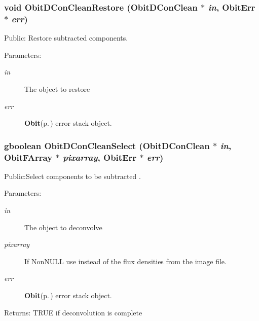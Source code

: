 \subsubsection{\setlength{\rightskip}{0pt plus 5cm}void Obit\-DCon\-Clean\-Restore ({\bf Obit\-DCon\-Clean} $\ast$ {\em in}, {\bf Obit\-Err} $\ast$ {\em err})}\label{ObitDConClean_8h_a25}


Public: Restore subtracted components. 

\begin{Desc}
\item[Parameters:]
\begin{description}
\item[{\em in}]The object to restore \item[{\em err}]{\bf Obit}{\rm (p.\,\pageref{structObit})} error stack object. \end{description}
\end{Desc}
\subsubsection{\setlength{\rightskip}{0pt plus 5cm}gboolean Obit\-DCon\-Clean\-Select ({\bf Obit\-DCon\-Clean} $\ast$ {\em in}, {\bf Obit\-FArray} $\ast$ {\em pixarray}, {\bf Obit\-Err} $\ast$ {\em err})}\label{ObitDConClean_8h_a23}


Public:Select components to be subtracted . 

\begin{Desc}
\item[Parameters:]
\begin{description}
\item[{\em in}]The object to deconvolve \item[{\em pixarray}]If Non\-NULL use instead of the flux densities from the image file. \item[{\em err}]{\bf Obit}{\rm (p.\,\pageref{structObit})} error stack object. \end{description}
\end{Desc}
\begin{Desc}
\item[Returns:]TRUE if deconvolution is complete \end{Desc}
